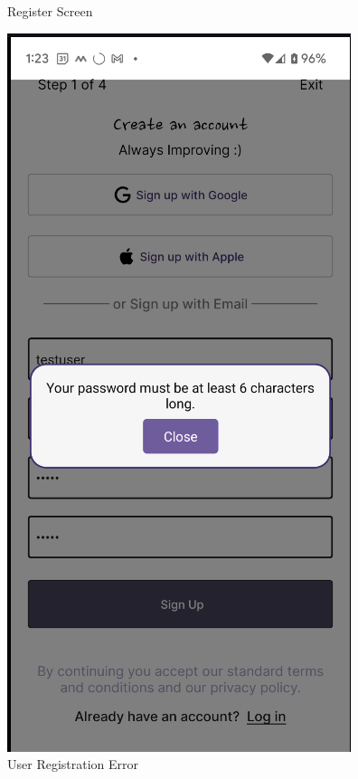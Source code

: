 \begin{figure}[htbp]
\begin{minipage}[t]{0.35\textwidth}
        \caption{Register Screen}
        \label{fig:register}
    \end{minipage}
    \hfill
    \begin{minipage}[t]{0.35\textwidth}
        \centering
        \includegraphics[width=\textwidth]{Screen Shots/Moneager/ScreenShotRegisterUserError.png}
        \caption{User Registration Error}
        \label{fig:registration-error}
    \end{minipage}
\end{figure}

